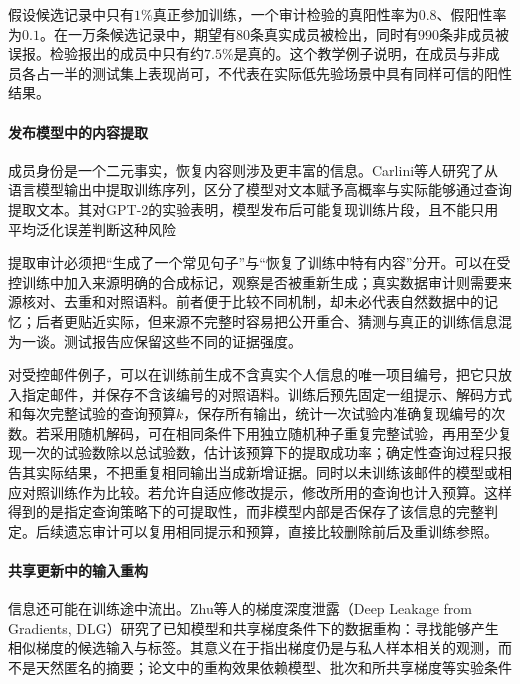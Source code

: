 \begin{example}[成员先验改变结果的含义]
\label{ex:privacy-membership-prior}
假设候选记录中只有$1\%$真正参加训练，一个审计检验的真阳性率为$0.8$、假阳性率为$0.1$。在一万条候选记录中，期望有80条真实成员被检出，同时有990条非成员被误报。检验报出的成员中只有约$7.5\%$是真的。这个教学例子说明，在成员与非成员各占一半的测试集上表现尚可，不代表在实际低先验场景中具有同样可信的阳性结果。
\end{example}

\paragraph{发布模型中的内容提取}

成员身份是一个二元事实，恢复内容则涉及更丰富的信息。Carlini等人研究了从语言模型输出中提取训练序列，区分了模型对文本赋予高概率与实际能够通过查询提取文本。其对GPT-2的实验表明，模型发布后可能复现训练片段，且不能只用平均泛化误差判断这种风险

提取审计必须把“生成了一个常见句子”与“恢复了训练中特有内容”分开。可以在受控训练中加入来源明确的合成标记，观察是否被重新生成；真实数据审计则需要来源核对、去重和对照语料。前者便于比较不同机制，却未必代表自然数据中的记忆；后者更贴近实际，但来源不完整时容易把公开重合、猜测与真正的训练信息混为一谈。测试报告应保留这些不同的证据强度。

对受控邮件例子，可以在训练前生成不含真实个人信息的唯一项目编号，把它只放入指定邮件，并保存不含该编号的对照语料。训练后预先固定一组提示、解码方式和每次完整试验的查询预算$k$，保存所有输出，统计一次试验内准确复现编号的次数。若采用随机解码，可在相同条件下用独立随机种子重复完整试验，再用至少复现一次的试验数除以总试验数，估计该预算下的提取成功率；确定性查询过程只报告其实际结果，不把重复相同输出当成新增证据。同时以未训练该邮件的模型或相应对照训练作为比较。若允许自适应修改提示，修改所用的查询也计入预算。这样得到的是指定查询策略下的可提取性，而非模型内部是否保存了该信息的完整判定。后续遗忘审计可以复用相同提示和预算，直接比较删除前后及重训练参照。

\paragraph{共享更新中的输入重构}

信息还可能在训练途中流出。Zhu等人的梯度深度泄露（Deep Leakage from Gradients, DLG）研究了已知模型和共享梯度条件下的数据重构：寻找能够产生相似梯度的候选输入与标签。其意义在于指出梯度仍是与私人样本相关的观测，而不是天然匿名的摘要；论文中的重构效果依赖模型、批次和所共享梯度等实验条件

